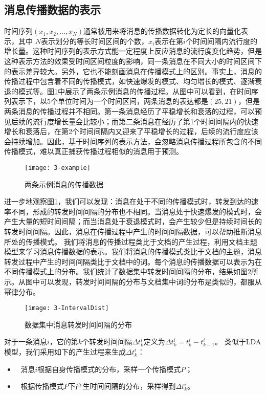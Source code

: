 \subsection{消息传播数据的表示}
时间序列$(x_1,x_2,...,x_N)$通常被用来将消息的传播数据转化为定长的向量化表示，其中 $N$表示划分的等长时间区间的个数，$x_i$表示在第$i$个时间间隔内流行度的增长量。这种时间序列的表示方式能一定程度上反应消息的流行度变化趋势，但是这种表示方法的效果受时间区间粒度的影响，同一条消息在不同大小的时间区间下的表示差异较大。另外，它也不能刻画消息在传播模式上的区别。事实上，消息的传播过程中包含着不同的传播模式，如快速爆发的模式、均匀增长的模式、逐渐衰退的模式等。图\ref{fig:example}中展示了两条示例消息的传播过程。从图中可以看到，在时间序列表示下，以5个单位时间为一个时间区间，两条消息的表达都是$(25,21)$，但是两条消息的传播过程并不相同。第一条消息经历了平稳增长和衰落的过程，可以预见后续的流行度增长量会比较小；而第二条消息在经历了第1个时间间隔内的快速增长和衰落后，在第2个时间间隔内又迎来了平稳增长的过程，后续的流行度应该会持续增加。因此，基于时间序列的表示方法，会忽略消息传播过程所包含的不同传播模式，难以真正捕获传播过程相似的消息用于预测。
\begin{figure}[!htbp]
  \centering
  \texttt{[image: 3-example]}
  \caption{两条示例消息的传播数据}
  \label{fig:example}
\end{figure}

进一步地观察图\ref{fig:example}，我们可以发现：消息在处于不同的传播模式时，转发到达的速率不同，形成的转发时间间隔的分布也不相同。当消息处于快速爆发的模式时，会产生大量的短时间间隔；而当消息处于衰退模式时，会产生较少但是持续时间长的转发时间间隔。因此，消息在传播过程中产生的时间间隔数据，可以帮助推断消息所处的传播模式。
我们将消息的传播过程类比于文档的产生过程，利用文档主题模型来学习消息传播数据的表示。我们将消息的传播模式类比于文档的主题，消息转发过程中产生的时间间隔类比于文档中的词。每个消息的传播数据可以表示为在不同传播模式上的分布。我们统计了数据集中转发时间间隔的分布，结果如图\ref{fig:intervalDist}所示。从图中可以发现，转发时间间隔的分布与文档集中词的分布是类似的，都服从幂律分布。
\begin{figure}[!htbp]
  \centering
  \texttt{[image: 3-IntervalDist]}
  \caption{数据集中消息转发时间间隔的分布}
  \label{fig:intervalDist}
\end{figure}

对于一条消息$i$，它的第$k$个转发时间间隔$\Delta t_k^i$定义为$\Delta t_k^i=t_k^i-t_{k-1}^i$。 类似于LDA模型，我们采用如下的产生过程来生成$\Delta t_k^i$：
\begin{itemize}
\item	消息$i$根据自身传播模式的分布，采样一个传播模式$P$；
\item	根据传播模式$P$下产生时间间隔的分布，采样得到$\Delta t_k^i$。
\end{itemize}


